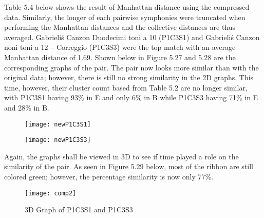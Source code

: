 Table 5.4 below shows the result of Manhattan distance using the compressed data. Similarly, the longer of each pairwise symphonies were truncated when performing the Manhattan distances and the collective distances are thus averaged. Gabrieli\'s Canzon Duodecimi toni a 10 (P1C3S1) and Gabrieli\'s Canzon noni toni a 12 – Correggio (P1C3S3) were the top match with an average Manhattan distance of 1.69. Shown below in Figure 5.27 and 5.28 are the corresponding graphs of the pair. The pair now looks more similar than with the original data; however, there is still no strong similarity in the 2D graphs. This time, however, their cluster count based from Table 5.2 are no longer similar, with P1C3S1 having 93\% in E and only 6\% in B while P1C3S3 having 71\% in E and 28\% in B.

\begin{figure}[H]
\begin{minipage}{.5\textwidth}
  \centering
  \texttt{[image: newP1C3S1]}
  \label{fig:test1}
\end{minipage}
\begin{minipage}{.5\textwidth}
  \centering
  \texttt{[image: newP1C3S3]}
  \label{fig:test2}
\end{minipage}
\end{figure}

Again, the graphs shall be viewed in 3D to see if time played a role on the similarity of the pair. As seen in Figure 5.29 below, most of the ribbon are still colored green; however, the percentage similarity is now only 77\%.

\begin{figure}[H]
\caption{3D Graph of P1C3S1 and P1C3S3}
\centering
\texttt{[image: comp2]}
\end{figure}

